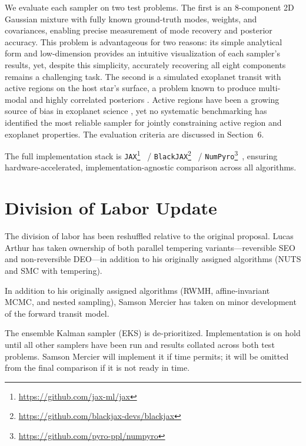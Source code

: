 \documentclass{article}
\begin{document}
We evaluate each sampler on two test problems. The first is an 8-component 2D Gaussian mixture with fully known ground-truth modes, weights, and covariances, enabling precise measurement of mode recovery and posterior accuracy. This problem is advantageous for two reasons: its simple analytical form and low-dimension provides an intuitive visualization of each sampler's results, yet, despite this simplicity, accurately recovering all eight components remains a challenging task. The second is a simulated exoplanet transit with active regions on the host star's surface, a problem known to produce multi-modal and highly correlated posteriors \cite{Pinhas2018, Rackham2018, Sagynbayeva2025}. Active regions have been a growing source of bias in exoplanet science \cite{Murray2025}, yet no systematic benchmarking has identified the most reliable sampler for jointly constraining active region and exoplanet properties. The evaluation criteria are discussed in Section~6.

The full implementation stack is \texttt{JAX}\footnote{\url{https://github.com/jax-ml/jax}}~\cite{jax2018github} / \texttt{BlackJAX}\footnote{\url{https://github.com/blackjax-devs/blackjax}}~\cite{blackjax} /
\texttt{NumPyro}\footnote{\url{https://github.com/pyro-ppl/numpyro}}~\cite{numpyro}, ensuring hardware-accelerated, implementation-agnostic
comparison across all algorithms.

\section{Division of Labor Update}

The division of labor has been reshuffled relative to the original proposal.
Lucas Arthur has taken ownership of both parallel tempering variants---reversible
SEO and non-reversible DEO---in addition to his originally assigned algorithms
(NUTS and SMC with tempering).

In addition to his originally assigned algorithms (RWMH,
affine-invariant MCMC, and nested sampling), Samson Mercier has taken on minor development of the forward transit model.

The ensemble Kalman sampler (EKS) is de-prioritized. Implementation is on hold
until all other samplers have been run and results collated across both test
problems. Samson Mercier will implement it if time permits; it will be omitted
from the final comparison if it is not ready in time.
\end{document}

